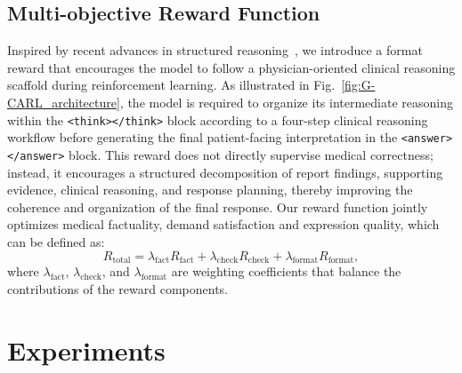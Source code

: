 \documentclass[letterpaper]{article} %
\begin{document}
\subsection{Multi-objective Reward Function}
\label{multi_obj_reward}
Inspired by recent advances in structured reasoning~\cite{yu2025docthinker}, we introduce a format reward that encourages the model to follow a physician-oriented clinical reasoning scaffold during reinforcement learning. As illustrated in Fig.~\ref{fig:G-CARL_architecture}, the model is required to organize its intermediate reasoning within the \texttt{<think>}\texttt{</think>} block according to a four-step clinical reasoning workflow before generating the final patient-facing interpretation in the \texttt{<answer>}\texttt{</answer>} block. This reward does not directly supervise medical correctness; instead, it encourages a structured decomposition of report findings, supporting evidence, clinical reasoning, and response planning, thereby improving the coherence and organization of the final response.
Our reward function jointly optimizes medical factuality, demand satisfaction and expression quality, which can be defined as:
\begin{equation}
R_\text{total}
=
\lambda_{\text{fact}}R_\text{fact}
+
\lambda_{\text{check}}R_\text{check}
+
\lambda_{\text{format}}R_\text{format},
\end{equation}
where $\lambda_{\mathrm{fact}}$, $\lambda_{\mathrm{check}}$, and $\lambda_{\mathrm{format}}$ are weighting coefficients that balance the contributions of the reward components.




\section{Experiments}
\end{document}
